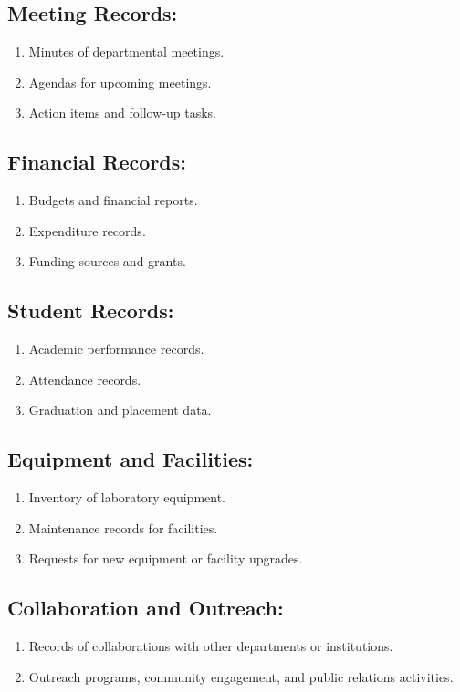 \documentclass[a4paper, 12pt]{article}
\begin{document}
\subsection*{Meeting Records:}
\begin{enumerate}
  \item Minutes of departmental meetings.
  \item Agendas for upcoming meetings.
  \item Action items and follow-up tasks.
\end{enumerate}

\subsection*{Financial Records:}
\begin{enumerate}
  \item Budgets and financial reports.
  \item Expenditure records.
  \item Funding sources and grants.
\end{enumerate}

\subsection*{Student Records:}
\begin{enumerate}
  \item Academic performance records.
  \item Attendance records.
  \item Graduation and placement data.
\end{enumerate}

\subsection*{Equipment and Facilities:}
\begin{enumerate}
  \item Inventory of laboratory equipment.
  \item Maintenance records for facilities.
  \item Requests for new equipment or facility upgrades.
\end{enumerate}

\subsection*{Collaboration and Outreach:}
\begin{enumerate}
  \item Records of collaborations with other departments or institutions.
  \item Outreach programs, community engagement, and public relations activities.
\end{enumerate}
\end{document}

